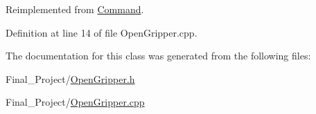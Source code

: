 Reimplemented from \hyperlink{classCommand_ae5846b4332a262e055c7a96759fa18f2}{Command}.



Definition at line 14 of file Open\-Gripper.\-cpp.



The documentation for this class was generated from the following files\-:\begin{DoxyCompactItemize}
\item 
Final\-\_\-\-Project/\hyperlink{OpenGripper_8h}{Open\-Gripper.\-h}\item 
Final\-\_\-\-Project/\hyperlink{OpenGripper_8cpp}{Open\-Gripper.\-cpp}\end{DoxyCompactItemize}
